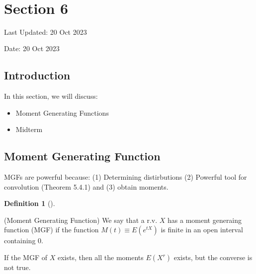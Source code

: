 \documentclass[
  letterpaper,
  DIV=11,
  numbers=noendperiod]{scrreprt}
\providecommand{\tightlist}{%
  \setlength{\itemsep}{0pt}\setlength{\parskip}{0pt}}\usepackage{longtable,booktabs,array}
\theoremstyle{plain}
\theoremstyle{definition}
\newtheorem{definition}{Definition}[chapter]
\theoremstyle{remark}
\begin{document}
\(\,\)


\hypertarget{section-6}{%
\chapter*{Section 6}\label{section-6}}


Last Updated: 20 Oct 2023

Date: 20 Oct 2023

\hypertarget{introduction-5}{%
\section*{Introduction}\label{introduction-5}}


In this section, we will discuss:

\begin{itemize}
\tightlist
\item
  Moment Generating Functions
\item
  Midterm
\end{itemize}

\hypertarget{moment-generating-function}{%
\section*{Moment Generating Function}\label{moment-generating-function}}


MGFs are powerful because: (1) Determining distirbutions (2) Powerful
tool for convolution (Theorem 5.4.1) and (3) obtain moments.

\leavevmode{}%
\begin{definition}[]\label{def-Moment-Generating-Function}

(Moment Generating Function) We say that a r.v. \(\displaystyle X\) has
a moment generaing function (MGF) if the function
\(\displaystyle M( t) \equiv E\left( e^{tX}\right)\) is finite in an
open interval containing 0.

\end{definition}

If the MGF of \(\displaystyle X\) exists, then all the moments
\(\displaystyle E\left( X^{r}\right)\) exists, but the converse is not
true.
\end{document}
